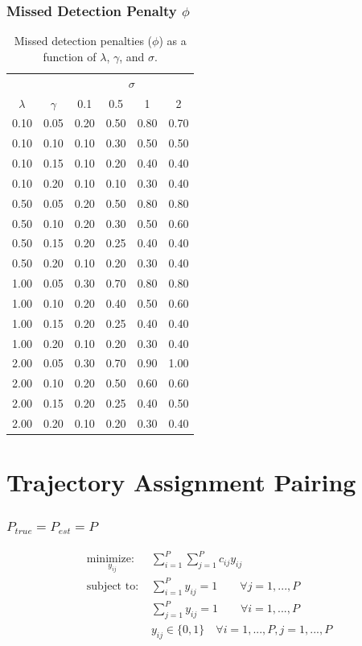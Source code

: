 \documentclass{beamer}
\begin{document}
\begin{frame}[noframenumbering]
\frametitle{Missed Detection Penalty $\phi$}
\begin{table}\tiny
\centering
\begin{tabular}{cc|cccc}
  \hline
  & & \multicolumn{4}{c}{$\sigma$} \\
  \cline{3-6}
 $\lambda$ & $\gamma$ & 0.1 & 0.5 & 1 & 2 \\ 
  \hline
  \hline
   0.10 & 0.05 & 0.20 & 0.50 & 0.80 & 0.70 \\ 
   0.10 & 0.10 & 0.10 & 0.30 & 0.50 & 0.50 \\ 
   0.10 & 0.15 & 0.10 & 0.20 & 0.40 & 0.40 \\ 
   0.10 & 0.20 & 0.10 & 0.10 & 0.30 & 0.40 \\ 
   0.50 & 0.05 & 0.20 & 0.50 & 0.80 & 0.80 \\ 
   0.50 & 0.10 & 0.20 & 0.30 & 0.50 & 0.60 \\ 
   0.50 & 0.15 & 0.20 & 0.25 & 0.40 & 0.40 \\ 
   0.50 & 0.20 & 0.10 & 0.20 & 0.30 & 0.40 \\ 
   1.00 & 0.05 & 0.30 & 0.70 & 0.80 & 0.80 \\ 
   1.00 & 0.10 & 0.20 & 0.40 & 0.50 & 0.60 \\ 
   1.00 & 0.15 & 0.20 & 0.25 & 0.40 & 0.40 \\ 
   1.00 & 0.20 & 0.10 & 0.20 & 0.30 & 0.40 \\ 
   2.00 & 0.05 & 0.30 & 0.70 & 0.90 & 1.00 \\ 
   2.00 & 0.10 & 0.20 & 0.50 & 0.60 & 0.60 \\ 
   2.00 & 0.15 & 0.20 & 0.25 & 0.40 & 0.50 \\ 
   2.00 & 0.20 & 0.10 & 0.20 & 0.30 & 0.40 \\ 
   \hline
\end{tabular}
\caption{Missed detection penalties ($\phi$) as a function of $\lambda$, $\gamma$, and $\sigma$.}
\end{table}
\end{frame}

\section{Trajectory Assignment Pairing}

\begin{frame}[noframenumbering]
\frametitle{$P_{true} = P_{est} = P$}
\begin{align*}
\underset{y_{ij}}{\text{minimize: }} & \sum_{i=1}^{P} \sum_{j=1}^{P} c_{ij}y_{ij}\\
\text{subject to: }	& \sum_{i=1}^{P} y_{ij} = 1 \qquad \forall j = 1,...,P \nonumber \\
				& \sum_{j=1}^{P} y_{ij} = 1 \qquad \forall i = 1,...,P \nonumber \\
				& y_{ij} \in \{0,1\} \quad \forall i = 1,...,P,j = 1,...,P \nonumber
\end{align*}
\end{frame}
\end{document}
